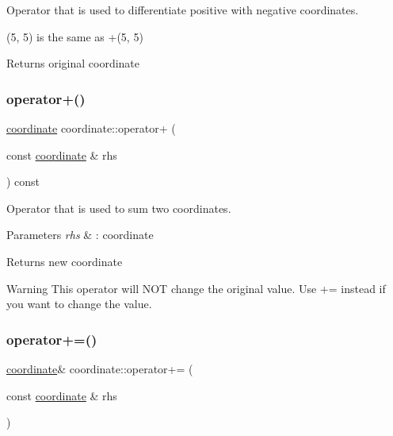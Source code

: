 Operator that is used to differentiate positive with negative coordinates. 

(5, 5) is the same as +(5, 5) \begin{DoxyReturn}{Returns}
original coordinate 
\end{DoxyReturn}
\mbox{\label{classcoordinate_ad82716aaea1e1ca9bc2bd28121e9ff3e}} 
\subsubsection{\texorpdfstring{operator+()}{operator+()}\hspace{0.1cm}{\footnotesize\ttfamily [2/2]}}
{\footnotesize\ttfamily \hyperlink{classcoordinate}{coordinate} coordinate\+::operator+ (\begin{DoxyParamCaption}\item[{const \hyperlink{classcoordinate}{coordinate} \&}]{rhs }\end{DoxyParamCaption}) const\hspace{0.3cm}{\ttfamily [inline]}}



Operator that is used to sum two coordinates. 


\begin{DoxyParams}{Parameters}
{\em rhs} & \+: coordinate \\
\hline
\end{DoxyParams}
\begin{DoxyReturn}{Returns}
new coordinate 
\end{DoxyReturn}
\begin{DoxyWarning}{Warning}
This operator will N\+OT change the original value. Use += instead if you want to change the value. 
\end{DoxyWarning}
\mbox{\label{classcoordinate_a8c842f84e51d6a8509f22a159aeed8a2}} 
\subsubsection{\texorpdfstring{operator+=()}{operator+=()}}
{\footnotesize\ttfamily \hyperlink{classcoordinate}{coordinate}\& coordinate\+::operator+= (\begin{DoxyParamCaption}\item[{const \hyperlink{classcoordinate}{coordinate} \&}]{rhs }\end{DoxyParamCaption})\hspace{0.3cm}{\ttfamily [inline]}}




